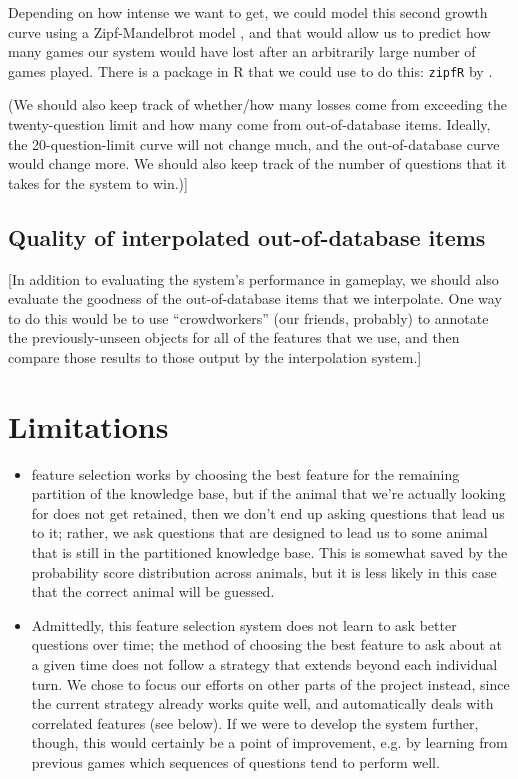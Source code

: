 \documentclass[11pt,a4paper]{article}
\begin{document}
Depending on how intense we want to get, we could model this second growth curve using a Zipf-Mandelbrot model \citep{Evert2004}, and that would allow us to predict how many games our system would have lost after an arbitrarily large number of games played.
There is a package in R that we could use to do this: \texttt{zipfR} by \citet{BaroniEvert2014}.

(We should also keep track of whether/how many losses come from exceeding the twenty-question limit and how many come from out-of-database items. Ideally, the 20-question-limit curve will not change much, and the out-of-database curve would change more.
We should also keep track of the number of questions that it takes for the system to win.)]

\subsection{Quality of interpolated out-of-database items}

[In addition to evaluating the system's performance in gameplay, we should also evaluate the goodness of the out-of-database items that we interpolate.
One way to do this would be to use ``crowdworkers'' (our friends, probably) to annotate the previously-unseen objects for all of the features that we use, and then compare those results to those output by the interpolation system.]

\section{Limitations}
\label{sec:limit}

\begin{itemize}
\item feature selection works by choosing the best feature for the remaining partition of the knowledge base, but if the animal that we're actually looking for does not get retained, then we don't end up asking questions that lead us to it; rather, we ask questions that are designed to lead us to some animal that is still in the partitioned knowledge base. This is somewhat saved by the probability score distribution across animals, but it is less likely in this case that the correct animal will be guessed.
\item Admittedly, this feature selection system does not learn to ask better questions over time; the method of choosing the best feature to ask about at a given time does not follow a strategy that extends beyond each individual turn.
We chose to focus our efforts on other parts of the project instead, since the current strategy already works quite well, and automatically deals with correlated features (see below).
If we were to develop the system further, though, this would certainly be a point of improvement, e.g. by learning from previous games which sequences of questions tend to perform well.
\end{itemize}
\end{document}
